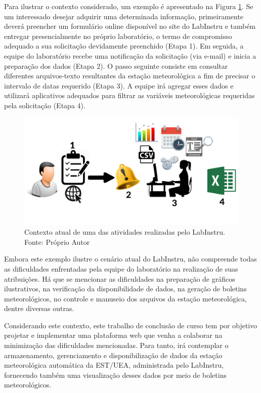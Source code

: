 Para ilustrar o contexto considerado, um exemplo é apresentado na Figura \ref{fig:contexto}. Se um interessado desejar adquirir uma determinada informação, primeiramente deverá preencher um formulário online disponível no site do LabInstru e também entregar presencialmente no próprio laboratório, o termo de compromisso adequado a sua solicitação devidamente preenchido (Etapa 1). Em seguida, a equipe do laboratório recebe uma notificação da solicitação (via e-mail) e inicia a preparação dos dados (Etapa 2). O passo seguinte consiste em consultar diferentes arquivos-texto resultantes da estação meteorológica a fim de precisar o intervalo de datas requerido (Etapa 3). A equipe irá agregar esses dados e utilizará aplicativos adequados para filtrar as variáveis meteorológicas requeridas pela solicitação (Etapa 4).

\begin{figure}[H]
	\centering
	\includegraphics[width=1\textwidth]{./img/contexto.png}
	\caption{Contexto atual de uma das atividades realizadas pelo LabInstru. Fonte: Próprio Autor} 			\label{fig:contexto}
\end{figure}

Embora este exemplo ilustre o cenário atual do LabInstru, não compreende todas as dificuldades enfrentadas pela equipe do laboratório na realização de suas atribuições. Há que se mencionar as dificuldades na preparação de gráficos ilustrativos, na verificação da disponibilidade de dados, na geração de boletins meteorológicos, no controle e manuseio dos arquivos da estação meteorológica, dentre diversas outras.

Considerando este contexto, este trabalho de conclusão de curso tem por objetivo projetar e implementar uma plataforma web que venha a colaborar na minimização das dificuldades mencionadas. Para tanto, irá contemplar o armazenamento, gerenciamento e disponibilização de dados da estação meteorológica automática da EST/UEA, administrada pelo LabInstru, fornecendo também uma visualização desses dados por meio de boletins meteorológicos.

